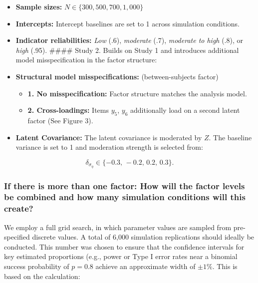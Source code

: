 \documentclass[
  man,
  floatsintext]{apa7}
\providecommand{\tightlist}{%
  \setlength{\itemsep}{0pt}\setlength{\parskip}{0pt}}
\begin{document}
\begin{itemize}
\item
  \textbf{Sample sizes:} \(N \in \{300, 500, 700, 1,000\}\)
\item
  \textbf{Intercepts:} Intercept baselines are set to 1 across
  simulation conditions.\\
\item
  \textbf{Indicator reliabilities:} \emph{Low} (.6), \emph{moderate}
  (.7), \emph{moderate to high} (.8), or \emph{high} (.95). \#\#\#\#
  Study 2. Builds on Study 1 and introduces additional model
  misspecification in the factor structure:
\item
  \textbf{Structural model misspecifications:} (between-subjects factor)

  \begin{itemize}
  \tightlist
  \item
    \textbf{1. No misspecification:} Factor structure matches the
    analysis model.
  \item
    \textbf{2. Cross-loadings:} Items \(y_5\), \(y_6\) additionally load
    on a second latent factor (See Figure 3).\\
  \end{itemize}
\item
  \textbf{Latent Covariance:} The latent covariance is moderated by
  \(Z\). The baseline variance is set to 1 and moderation strength is
  selected from:
\end{itemize}

\[
\delta_{\sigma_\eta} \in \{-0.3,\,-0.2,\,0.2,\,0.3\}.
\]

\subsubsection{If there is more than one factor: How will the factor
levels be combined and how many simulation conditions will this
create?}\label{if-there-is-more-than-one-factor-how-will-the-factor-levels-be-combined-and-how-many-simulation-conditions-will-this-create}

We employ a full grid search, in which parameter values are sampled from
pre-specified discrete values. A total of 6,000 simulation replications
should ideally be conducted. This number was chosen to ensure that the
confidence intervals for key estimated proportions (e.g., power or Type
I error rates near a binomial success probability of \(p = 0.8\) achieve
an approximate width of \(\pm 1\%\). This is based on the calculation:
\end{document}
